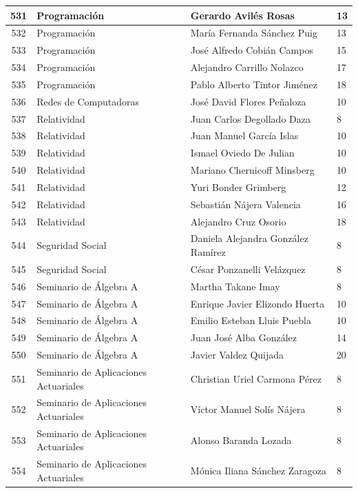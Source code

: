{\begin{longtable}{|c|p{6.5cm}|p{5cm}|p{1.5cm}|}
  531 & Programación & Gerardo Avilés Rosas & 13 \\ \hline
  532 & Programación & María Fernanda Sánchez Puig & 13 \\ \hline
  533 & Programación & José Alfredo Cobián Campos & 15 \\ \hline
  534 & Programación & Alejandro Carrillo Nolazco & 17 \\ \hline
  535 & Programación & Pablo Alberto Tintor Jiménez & 18 \\ \hline
  536 & Redes de Computadoras & José David Flores Peñaloza & 10 \\ \hline
  537 & Relatividad & Juan Carlos Degollado Daza & 8 \\ \hline
  538 & Relatividad & Juan Manuel García Islas & 10 \\ \hline
  539 & Relatividad & Ismael Oviedo De Julian & 10 \\ \hline
  540 & Relatividad & Mariano Chernicoff Minsberg & 10 \\ \hline
  541 & Relatividad & Yuri Bonder Grimberg & 12 \\ \hline
  542 & Relatividad & Sebastián Nájera Valencia & 16 \\ \hline
  543 & Relatividad & Alejandro Cruz Osorio & 18 \\ \hline
  544 & Seguridad Social & Daniela Alejandra González Ramírez & 8 \\ \hline
  545 & Seguridad Social & César Ponzanelli Velázquez & 8 \\ \hline
  546 & Seminario de Álgebra A & Martha Takane Imay & 8 \\ \hline
  547 & Seminario de Álgebra A & Enrique Javier Elizondo Huerta & 10 \\ \hline
  548 & Seminario de Álgebra A & Emilio Esteban Lluis Puebla & 10 \\ \hline
  549 & Seminario de Álgebra A & Juan José Alba González & 14 \\ \hline
  550 & Seminario de Álgebra A & Javier Valdez Quijada & 20 \\ \hline
  551 & Seminario de Aplicaciones Actuariales & Christian Uriel Carmona Pérez & 8 \\ \hline
  552 & Seminario de Aplicaciones Actuariales & Víctor Manuel Solís Nájera & 8 \\ \hline
  553 & Seminario de Aplicaciones Actuariales & Alonso Baranda Lozada & 8 \\ \hline
  554 & Seminario de Aplicaciones Actuariales & Mónica Iliana Sánchez Zaragoza & 8 \\ \hline

\end{longtable}}
